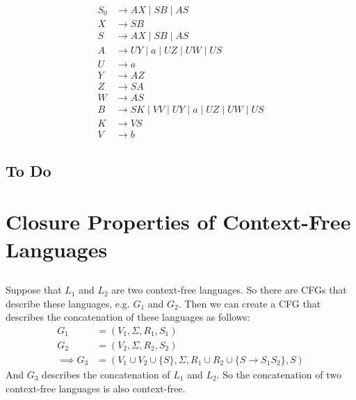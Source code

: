 \documentclass{article}
\numberwithin{equation}{subsection}
\begin{document}
\begin{equation}
\begin{aligned}
S_0 &\rightarrow AX \mid SB \mid AS\\
X &\rightarrow SB\\
S &\rightarrow AX \mid SB \mid AS\\
A &\rightarrow UY \mid a \mid UZ \mid UW \mid US\\
U &\rightarrow a\\
Y &\rightarrow AZ\\
Z &\rightarrow SA\\
W &\rightarrow AS\\
B &\rightarrow SK \mid VV \mid UY \mid a \mid UZ \mid UW \mid US\\
K &\rightarrow VS\\
V &\rightarrow b
\end{aligned}
\end{equation}

\subsection{To Do}

\section{Closure Properties of Context-Free Languages}
\subsection{}
Suppose that \(L_1\) and \(L_2\) are two context-free languages.
So there are CFGs that describe these languages, e.g. \(G_1\) and \(G_2\).
Then we can create a CFG that describes the concatenation of these languages as follows:
\begin{align*}
G_1 &= (V_1, \Sigma, R_1, S_1)\\
G_2 &= (V_2, \Sigma, R_2, S_2)\\
\implies G_3 &= (V_1 \cup V_2 \cup \{S\}, \Sigma, R_1 \cup R_2 \cup \{S \rightarrow S_1S_2\}, S)
\end{align*}
And \(G_3\) describes the concatenation of \(L_1\) and \(L_2\).
So the concatenation of two context-free languages is also context-free.
\end{document}
